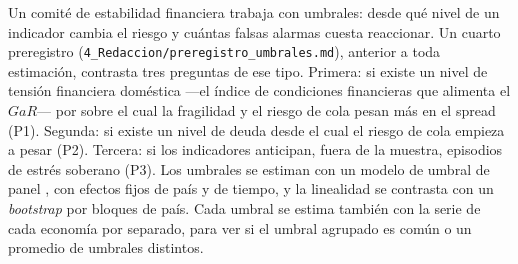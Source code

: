 Un comité de estabilidad financiera trabaja con umbrales: desde qué nivel de un indicador cambia el riesgo y cuántas falsas alarmas cuesta reaccionar. Un cuarto preregistro (\texttt{4\_Redaccion/preregistro\_umbrales.md}), anterior a toda estimación, contrasta tres preguntas de ese tipo. Primera: si existe un nivel de tensión financiera doméstica ---el índice de condiciones financieras que alimenta el $GaR$--- por sobre el cual la fragilidad y el riesgo de cola pesan más en el spread (P1). Segunda: si existe un nivel de deuda desde el cual el riesgo de cola empieza a pesar (P2). Tercera: si los indicadores anticipan, fuera de la muestra, episodios de estrés soberano (P3). Los umbrales se estiman con un modelo de umbral de panel \citep{Hansen1999,Hansen2000}, con efectos fijos de país y de tiempo, y la linealidad se contrasta con un \textit{bootstrap} por bloques de país. Cada umbral se estima también con la serie de cada economía por separado, para ver si el umbral agrupado es común o un promedio de umbrales distintos.


